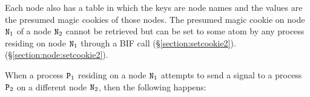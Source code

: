 Each node also has a table
in which the keys are node names and the values are
the presumed magic cookies of those nodes.  The presumed magic
cookie on node ${\tt{\sl N}}_1$ of a node ${\tt{\sl N}}_2$ cannot be retrieved but can
be set to some atom  by any process residing on node ${\tt{\sl N}}_1$ through a BIF
call
\ifOld {}
(\S\ref{section:setcookie2}).\fi
\ifStd {}
(\S\ref{section:node:setcookie2}).\fi

When a process ${\tt{\sl P}}_1$ residing on a node ${\tt{\sl N}}_1$ attempts
to send a signal  to a process ${\tt{\sl P}}_2$ on a different node ${\tt{\sl N}}_2$,
then the following happens:

